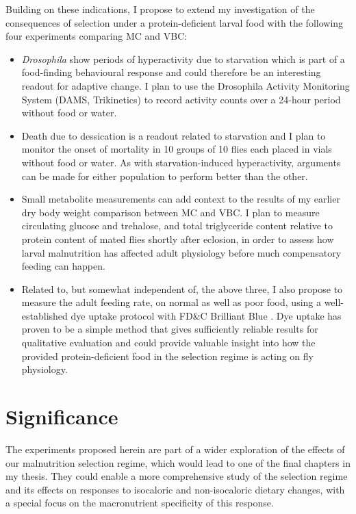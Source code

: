 \documentclass[12pt, onecolumn]{article}
\begin{document}
	Building on these indications, I propose to extend my investigation of the consequences of selection under a protein-deficient larval food with the following four experiments comparing MC and VBC:
	\begin{itemize}
		\item \textit{Drosophila} show periods of hyperactivity due to starvation \cite{Yu2016} which is part of a food-finding behavioural response and could therefore be an interesting readout for adaptive change. I plan to use the Drosophila Activity Monitoring System (DAMS, Trikinetics) to record activity counts over a 24-hour period without food or water.
		\item Death due to dessication is a readout related to starvation and I plan to monitor the onset of mortality in 10 groups of 10 flies each placed in vials without food or water. As with starvation-induced hyperactivity, arguments can be made for either population to perform better than the other.
		\item Small metabolite measurements can add context to the results of my earlier dry body weight comparison between MC and VBC. I plan to measure circulating glucose and trehalose, and total triglyceride content relative to protein content of mated flies shortly after eclosion, in order to assess how larval malnutrition has affected adult physiology before much compensatory feeding can happen.
		\item Related to, but somewhat independent of, the above three, I also propose to measure the adult feeding rate, on normal as well as poor food, using a well-established dye uptake protocol with FD\&C Brilliant Blue \cite{Shell2018}. Dye uptake has proven to be a simple method that gives sufficiently reliable results for qualitative evaluation \cite{Wong2009} and could provide valuable insight into how the provided protein-deficient food in the selection regime is acting on fly physiology.
	\end{itemize}

    \section*{Significance}
	The experiments proposed herein are part of a wider exploration of the effects of our malnutrition selection regime, which would lead to one of the final chapters in my thesis. They could enable a more comprehensive study of the selection regime and its effects on responses to isocaloric and non-isocaloric dietary changes, with a special focus on the macronutrient specificity of this response.
\end{document}
